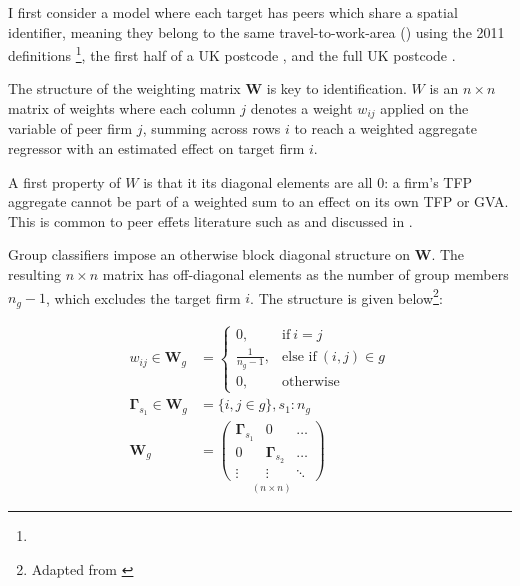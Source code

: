 I first consider a model where each target has peers which share a spatial identifier,
meaning they belong to the same travel-to-work-area () using the 2011 definitions
\footnote{},
the first half of a UK postcode ,
and the full UK postcode .
\par
The structure of the weighting matrix $\mathbf W$ is key to identification.
$W$ is an $n\times n$ matrix of weights where each column $j$ denotes a weight $w_{ij}$
applied on the variable of peer firm $j$, summing across rows $i$
to reach a weighted aggregate regressor
with an estimated effect on target firm $i$.
\par
A first property of $W$ is that it its diagonal elements are all $0$:
a firm's TFP aggregate cannot be part of a weighted sum to an effect on its own TFP or GVA.
This is common to peer effets literature such as \cite{Moffitt2001}
and discussed in \cite{Bramoulle2009}.
\par
Group classifiers impose an otherwise block diagonal structure on $\mathbf W$.
The resulting $n\times n$ matrix has off-diagonal elements as
the number of group members $n_g-1$, which excludes the target firm $i$.
The structure is given below\footnote{
    Adapted from \cite{Bramoulle2009}
}:

\begin{align*}
    w_{ij}\in \mathbf W_g &=
        \begin{cases}
            0,              & \text{if}         \ i=j           \\
            \frac1{n_g-1},  & \text{else if}    \ (i,j)\in g    \\
            0,              & \text{otherwise}
        \end{cases}
    \\
    \mathbf \Gamma_{s_1} \in \mathbf W_g
    &=
    \{ i, j \in g \}, s_1: n_g
    \\
    \mathbf W_g
    &=
    \underset{(n\times n)}{
        \begin{pmatrix}
            \mathbf \Gamma_{s_1}    &   0                       &   \dots       \\
            0                       &   \mathbf \Gamma_{s_2}    &   \dots       \\
            \vdots                  &   \vdots                  &   \ddots
        \end{pmatrix}
    }
\end{align*}

